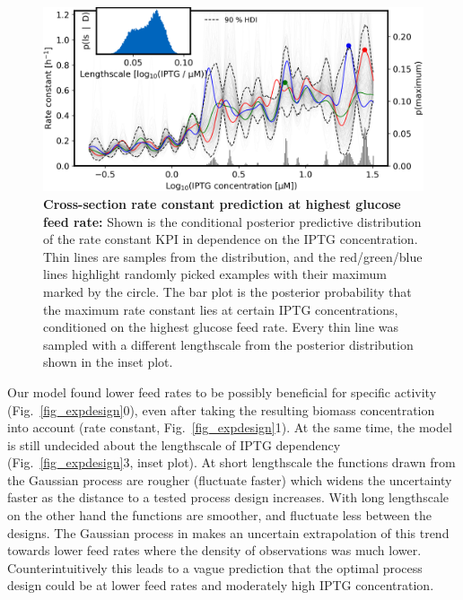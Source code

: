 \documentclass[sn-standardnature]{sn-jnl}%
\theoremstyle{thmstyleone}%
\theoremstyle{thmstyletwo}%
\theoremstyle{thmstylethree}%
\begin{document}
\begin{figure}[H]
    \centering
    \includegraphics[width=1.0\textwidth]{figures/plot_pp_dense_dense_k_design_crossection.png}
    \caption{
        \textbf{Cross-section rate constant prediction at highest glucose feed rate:}
        Shown is the conditional posterior predictive distribution of the rate constant KPI in dependence on the IPTG concentration.
        Thin lines are samples from the distribution, and the red/green/blue lines highlight randomly picked examples with their maximum marked by the circle.
        The bar plot is the posterior probability that the maximum rate constant lies at certain IPTG concentrations, conditioned on the highest glucose feed rate.
        Every thin line was sampled with a different lengthscale from the posterior distribution shown in the inset plot.
    }
    \label{fig_kdesign_crossection}
\end{figure}

Our model found lower feed rates to be possibly beneficial for specific activity (Fig.~\ref{fig_expdesign}0), even after taking the resulting biomass concentration into account (rate constant, Fig.~\ref{fig_expdesign}1).
At the same time, the model is still undecided about the lengthscale of IPTG dependency (Fig.~\ref{fig_expdesign}3, inset plot).
At short lengthscale the functions drawn from the Gaussian process are rougher (fluctuate faster) which widens the uncertainty faster as the distance to a tested  process design increases.
With long lengthscale on the other hand the functions are smoother, and fluctuate less between the designs.
The Gaussian process in makes an uncertain extrapolation of this trend towards lower feed rates where the density of observations was much lower.
Counterintuitively this leads to a vague prediction that the optimal process design could be at lower feed rates and moderately high IPTG concentration.
\end{document}
